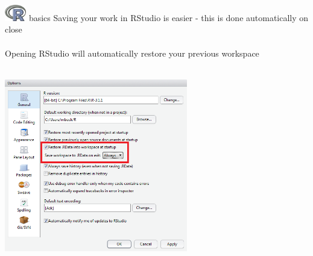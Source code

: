 \documentclass[xcolor=svgnames]{beamer}\usepackage[]{graphicx}\usepackage[]{color}
\begin{document}
\begin{frame}[t,fragile]{\includegraphics[width=0.07\textwidth]{Rlogo.jpg} \hspace{0.01in} basics}
Saving your work in RStudio is easier - this is done automatically on close\\~\\
Opening RStudio will automatically restore your previous workspace \\~\\
\centerline{\includegraphics[width = 0.6\textwidth]{rstudio_options.png}}
\end{frame}
\end{document}
